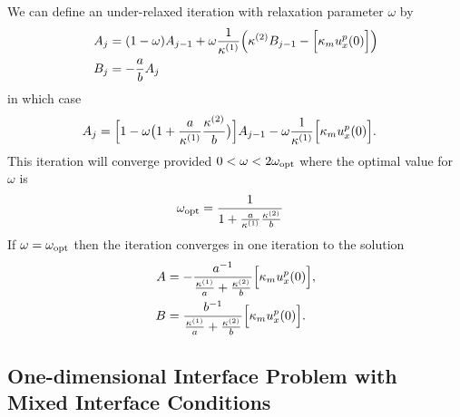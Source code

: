 \documentclass[11pt]{article}
\begin{document}
We can define an under-relaxed iteration with relaxation parameter $\omega$ by 
\begin{align*}
    A_j &= (1-\omega)A_{j-1} + \omega {1\over \kappa^{(1)}}\Big(\kappa^{(2)} B_{j-1} - \Big[\kappa_mu^p_x(0)\Big]\Big) \\
    B_j &= -{ a\over b} A_j
\end{align*}
in which case
\begin{align*}
   A_j &= \Big[ 1 -\omega\big(1+{a\over\kappa^{(1)}}{\kappa^{(2)}\over b}\big) \Big] A_{j-1} -
                         \omega{ {1\over \kappa^{(1)}} \Big[\kappa_mu^p_x(0)\Big] } . 
\end{align*}
This iteration will converge provided $0< \omega < 2\omega_{\rm opt}$ where
the optimal value for $\omega$ is
\begin{align*}
   \omega_{\rm opt} &= {1 \over 1+{a\over\kappa^{(1)}}{\kappa^{(2)}\over b} }
\end{align*}
If $\omega=\omega_{\rm opt}$ then the iteration converges in one iteration to the solution
\begin{align*}
   A &=   - {a^{-1} \over \frac{\kappa^{(1)}}{a} + \frac{\kappa^{(2)}}{b} } \Big[\kappa_mu^p_x(0)\Big], \\ 
   B &=     {b^{-1} \over \frac{\kappa^{(1)}}{a} + \frac{\kappa^{(2)}}{b} } \Big[\kappa_mu^p_x(0)\Big] .
\end{align*}

\clearpage 
\subsection{One-dimensional Interface Problem with Mixed Interface Conditions}
\end{document}
